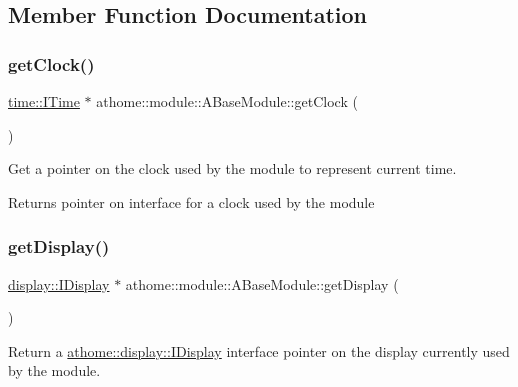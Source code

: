 \subsection{Member Function Documentation}
\mbox{\label{classathome_1_1module_1_1_a_base_module_a6204e0dd2cb6fa166f96c62224e7d10d}} 
\subsubsection{\texorpdfstring{get\+Clock()}{getClock()}}
{\footnotesize\ttfamily \mbox{\hyperlink{structathome_1_1time_1_1_i_time}{time\+::\+I\+Time}} $\ast$ athome\+::module\+::\+A\+Base\+Module\+::get\+Clock (\begin{DoxyParamCaption}{ }\end{DoxyParamCaption})}

Get a pointer on the clock used by the module to represent current time.

\begin{DoxyReturn}{Returns}
pointer on interface for a clock used by the module 
\end{DoxyReturn}
\mbox{\label{classathome_1_1module_1_1_a_base_module_ada20b6ad1e6f750d2886f1e7b10cca70}} 
\subsubsection{\texorpdfstring{get\+Display()}{getDisplay()}}
{\footnotesize\ttfamily \mbox{\hyperlink{classathome_1_1display_1_1_i_display}{display\+::\+I\+Display}} $\ast$ athome\+::module\+::\+A\+Base\+Module\+::get\+Display (\begin{DoxyParamCaption}{ }\end{DoxyParamCaption})}

Return a \mbox{\hyperlink{classathome_1_1display_1_1_i_display}{athome\+::display\+::\+I\+Display}} interface pointer on the display currently used by the module.

